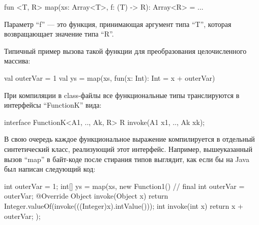 \begin{pyglist}[language=kotlin]
fun <T, R> map(xs: Array<T>, f: (T) -> R): Array<R> = ...
\end{pyglist}

Параметр ``f'' --- это функция, принимающая аргумент типа ``T'', которая возвращающает значение
типа ``R''.

Типичный пример вызова такой функции для преобразования целочисленного массива:
\begin{pyglist}[language=kotlin]
    val outerVar = 1
    val ys = map(xs, fun(x: Int): Int = x + outerVar)
\end{pyglist}

При компиляции в class-файлы все функциональные типы транслируются в интерфейсы ``FunctionK''
вида:
\begin{pyglist}[language=java]
interface FunctionK<A1, .., Ak, R> {
    R invoke(A1 x1, .., Ak xk);
}
\end{pyglist}

В свою очередь каждое функциональное выражение компилируется в отдельный синтетический класс,
реализующий этот интерфейс. Например, вышеуказанный вызов ``map'' в байт-коде после стирания типов
выглядит, как если бы на Java был написан следующий код:
\begin{pyglist}[language=java]
    int outerVar = 1;
    int[] ys = map(xs,
    new Function1() {
        // final int outerVar = outerVar;
        @Override
        Object invoke(Object x) {
            return Integer.valueOf(invoke(((Integer)x).intValue()));
        }
        int invoke(int x) { return x + outerVar; }
    });
\end{pyglist}

